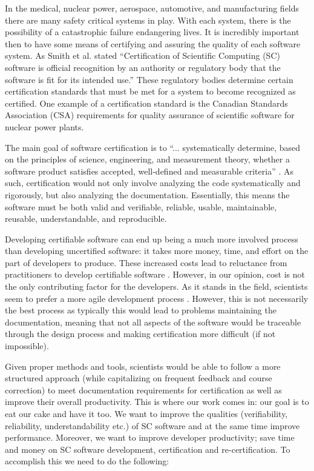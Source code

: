 \documentclass{sig-alternate-05-2015}
\begin{document}
In the medical, nuclear power, aerospace, automotive, and manufacturing fields
there are many safety critical systems in play. With each system, there is the
possibility of a catastrophic failure endangering lives. It is incredibly
important then to have some means of certifying and assuring the quality of each
software system. As Smith et al. \cite{SmithEtAl2013} stated
``Certification of Scientiﬁc Computing (SC) software is official recognition by
an authority or regulatory body that the software is ﬁt for its intended use.''
These regulatory bodies determine certain certification standards that must be
met for a system to become recognized as certified. One example of a
certification standard is the Canadian Standards Association (CSA) requirements
for quality assurance of scientific software for nuclear power plants.

The main goal of software certification is to ``... systematically determine,
based on the principles of science, engineering, and measurement theory, whether
a software product satisfies accepted, well-defined and measurable criteria''
\cite{HHLMWW}. As such, certification would not only involve analyzing the code
systematically and rigorously, but also analyzing the
documentation. Essentially, this means the software must be both valid and
verifiable, reliable, usable, maintainable, reusable, understandable, and
reproducible. %

Developing certifiable software can end up being a much more involved process
than developing uncertified software: it takes more money, time, and effort on
the part of developers to produce. These increased costs lead to reluctance from
practitioners to develop certifiable software \cite{Roache1998}. However, in
our 
opinion, cost is not the only contributing factor for the developers. As it
stands in the field, scientists seem to prefer a more agile development process
\cite{Segal2008}. However, this is not necessarily the best process as typically
this would lead to problems maintaining the
documentation, meaning that not all aspects of the software would be traceable
through the design process and making certification more difficult (if not
impossible).

Given proper methods and tools, scientists would be able to follow a more
structured approach (while capitalizing on frequent feedback and course
correction) to meet documentation requirements for certification as well as
improve their overall productivity. This is where our work comes in: our goal is
to eat our cake and have it too.  We want to improve the qualities
(verifiability, reliability, understandability etc.) of SC software and at the
same time
improve performance.  Moreover, we want to improve developer productivity; save
time and money on SC software development, certification and
re-certification. To accomplish this we need to do the following:
\end{document}
